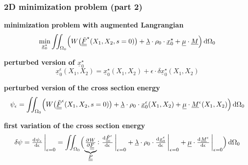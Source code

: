 \begin{frame}
  \frametitle{2D minimization problem (part 2)}

  \textbf{minimization problem with augmented Langrangian}
  \begin{displaymath}
    \min_{\underline{x}_0^{\star}} \iint_{\Omega_0} \Bigl( W \bigl( \doubleunderline{\tilde{F}}^{\star}(X_1,X_2,s=0) \bigr) + \underline{\lambda} \cdot \rho_0 \cdot \underline{x}_0^{\star} + \underline{\mu} \cdot \underline{M} \Bigr) \dif \Omega_0
  \end{displaymath}
  
  \vspace{0.5em}
  \textbf{perturbed version of $\underline{x}_0^{\star}$}
  \begin{displaymath}
    \underline{x}_0^{\epsilon}(X_1,X_2) = \underline{x}_0^{\star}(X_1,X_2) + \epsilon \cdot \delta \underline{x}_0^{\star}(X_1,X_2)
  \end{displaymath}
  
  \vspace{0.5em}
  \textbf{perturbed version of the cross section energy}
  \begin{displaymath}
    \psi_{\epsilon} = 
    \iint_{\Omega_0} \Bigl(
      W \bigl( \doubleunderline{\tilde{F}}^{\epsilon}(X_1,X_2,s=0) \bigr) + 
      \underline{\lambda} \cdot \rho_0 \cdot \underline{x}_0^{\epsilon}(X_1,X_2) +
      \underline{\mu} \cdot \underline{M}^{\epsilon}(X_1,X_2)
    \Bigr) \dif \Omega_0
  \end{displaymath}
  
  \vspace{0.5em}
  \textbf{first variation of the cross section energy}
  \begin{displaymath}
    \delta \psi = \od{\psi_{\epsilon}}{\epsilon} \sVert[3]_{\epsilon=0} =
    \iint_{\Omega_0} \Bigl(
      \underbrace{\pd{W}{\doubleunderline{F}}}_{\doubleunderline{P}} \colon \od{\doubleunderline{\tilde{F}}^{\epsilon}}{\epsilon} \sVert[3]_{\epsilon=0} +
      \underline{\lambda} \cdot \rho_0 \cdot \od{\underline{x}_0^{\epsilon}}{\epsilon} \sVert[3]_{\epsilon=0} +
      \underline{\mu} \cdot \od{\underline{M}^{\epsilon}}{\epsilon} \sVert[3]_{\epsilon=0}
    \Bigr) \dif \Omega_0
  \end{displaymath}
  
\end{frame}


